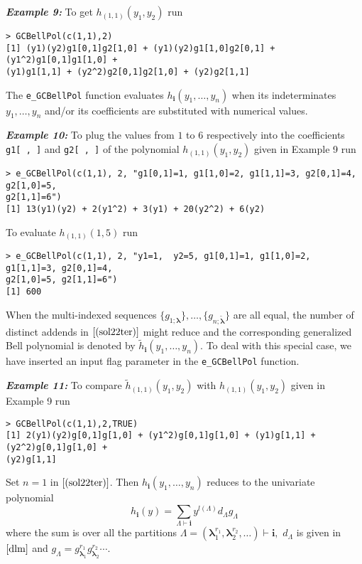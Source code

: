 \hskip-0.5cm\textbf{\emph{Example 9:}} To get \(h_{(1,1)}(y_1, y_2)\) run

\begin{verbatim}
> GCBellPol(c(1,1),2)
[1] (y1)(y2)g1[0,1]g2[1,0] + (y1)(y2)g1[1,0]g2[0,1] + (y1^2)g1[0,1]g1[1,0] +
(y1)g1[1,1] + (y2^2)g2[0,1]g2[1,0] + (y2)g2[1,1]
\end{verbatim}

The \texttt{e\_GCBellPol} function evaluates \(h_{\boldsymbol{i}}(y_1, \ldots, y_n)\) when its indeterminates \(y_1, \ldots, y_n\) and/or its coefficients are substituted with numerical values.

\hskip-0.5cm\textbf{\emph{Example 10:}} To plug the values from \(1\) to \(6\) respectively into the coefficients \texttt{g1{[}\ ,\ {]}} and \texttt{g2{[}\ ,\ {]}} of the polynomial \(h_{(1,1)}(y_1, y_2)\) given in Example 9 run

\begin{verbatim}
> e_GCBellPol(c(1,1), 2, "g1[0,1]=1, g1[1,0]=2, g1[1,1]=3, g2[0,1]=4, g2[1,0]=5, 
g2[1,1]=6")
[1] 13(y1)(y2) + 2(y1^2) + 3(y1) + 20(y2^2) + 6(y2)
\end{verbatim}

\noindent To evaluate \(h_{(1,1)}(1, 5)\) run

\begin{verbatim}
> e_GCBellPol(c(1,1), 2, "y1=1,  y2=5, g1[0,1]=1, g1[1,0]=2, g1[1,1]=3, g2[0,1]=4, 
g2[1,0]=5, g2[1,1]=6")
[1] 600
\end{verbatim}

When the multi-indexed sequences \(\{ g_{1; \boldsymbol{\lambda}}\}, \ldots, \{ g_{n; \boldsymbol{\tilde{\lambda}}}\}\) are all equal, the number of distinct addends in \(\eqref{(sol22ter)}\) might reduce and the corresponding generalized Bell polynomial is denoted by \(\tilde{h}_{\boldsymbol{i}}(y_1, \ldots, y_n)\). To deal with this special case, we have inserted an input flag parameter in the \texttt{e\_GCBellPol} function.

\hskip-0.5cm\textbf{\emph{Example 11:}} To compare \(\tilde{h}_{(1,1)}(y_1, y_2)\) with \(h_{(1,1)}(y_1, y_2)\) given in Example 9 run

\begin{verbatim}
> GCBellPol(c(1,1),2,TRUE)
[1] 2(y1)(y2)g[0,1]g[1,0] + (y1^2)g[0,1]g[1,0] + (y1)g[1,1] + (y2^2)g[0,1]g[1,0] +
(y2)g[1,1]
\end{verbatim}

Set \(n=1\) in \(\eqref{(sol22ter)}\). Then \(h_{\boldsymbol{i}}(y_1, \ldots, y_n)\) reduces to the univariate polynomial\\
\begin{equation}
h_{\boldsymbol{i}}(y) =  \sum_{{\Lambda} \vdash  \boldsymbol{i}} y^{l(\Lambda)} d_{\Lambda}  
g_{\Lambda}
\label{(redGC)}
\end{equation}
where the sum is over all the partitions \(\Lambda=(\boldsymbol{\lambda}_1^{r_1} , \boldsymbol{\lambda}_2^{r_2}, \ldots) \vdash \boldsymbol{i},\) \(d_{\Lambda}\) is given in \(\eqref{dlm}\) and
\(g_{\Lambda} = g_{\boldsymbol{\lambda}_1}^{r_1} g_{\boldsymbol{\lambda}_2}^{r_2} \cdots.\)

